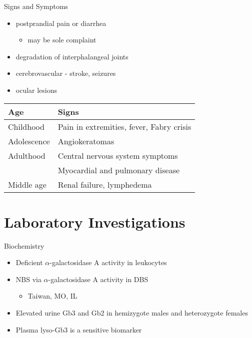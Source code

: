 \documentclass[presentation, smaller]{beamer}
\begin{document}
\begin{frame}[label={sec:orgheadline10}]{Signs and Symptoms}
\begin{itemize}
\item postprandial pain or diarrhea
\begin{itemize}
\item may be sole complaint
\end{itemize}
\item degradation of interphalangeal joints
\item cerebrovascular - stroke, seizures
\item ocular lesions
\end{itemize}


\begin{center}
\begin{tabular}{ll}
Age & Signs\\
\hline
Childhood & Pain in extremities, fever, Fabry crisis \footnotemark\\
Adolescence & Angiokeratomas\\
Adulthood & Central nervous system symptoms\\
 & Myocardial and pulmonary disease\\
Middle age & Renal failure, lymphedema\\
\end{tabular}
\end{center}
\end{frame}


\section{Laboratory Investigations}
\label{sec:orgheadline14}

\begin{frame}[label={sec:orgheadline12}]{Biochemistry}
\begin{itemize}
\item Deficient \(\alpha\)-galactosidase A activity in leukocytes
\item NBS via \(\alpha\)-galactosidase A activity in DBS
\begin{itemize}
\item Taiwan, MO, IL
\end{itemize}
\item Elevated urine Gb3 and Gb2 in hemizygote males and heterozygote females
\item Plasma lyso-Gb3 is a sensitive biomarker
\end{itemize}
\end{frame}
\end{document}
